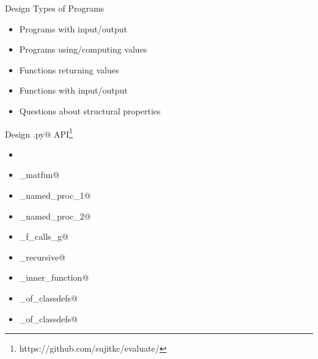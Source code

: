 \documentclass[aspectratio=169]{beamer}
\begin{document}
\begin{frame}{Design}
{Types of Programs}
\begin{itemize}
\item Programs with input/output
\item Programs using/computing values
\item Functions returning values
\item Functions with input/output
\item Questions about structural properties
\end{itemize}
\end{frame}

\begin{frame}{Design}
{\lstinline@evaluate.py@ API\footnote{https://github.com/sujitkc/evaluate/}}
\begin{itemize}
\item \lstinline@equals@
\item \lstinline@eval_matfun@
\item \lstinline@eval_named_proc_1@
\item \lstinline@eval_named_proc_2@
\item \lstinline@eval_f_calls_g@
\item \lstinline@is_recursive@
\item \lstinline@is_inner_function@
\item \lstinline@num_of_classdefs@
\item \lstinline@num_of_classdefs@
\end{itemize}
\end{frame}
\end{document}

